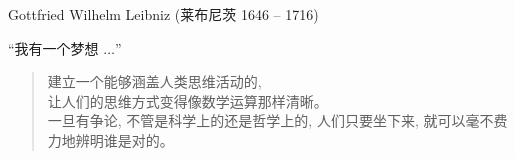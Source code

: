 \begin{frame}{}

  \pause
  \begin{center}
    Gottfried Wilhelm Leibniz (莱布尼茨 1646 -- 1716)
  \end{center}
\end{frame}

\begin{frame}{``我有一个梦想 $\ldots$''}
  \begin{quote}
    建立一个能够涵盖人类思维活动的,\\
    让人们的思维方式变得像数学运算那样清晰。\\[8pt]

    一旦有争论, 不管是科学上的还是哲学上的,
    人们只要坐下来,
    就可以毫不费力地辨明谁是对的。
  \end{quote}

  \vspace{0.80cm}
  \begin{quote}
    \centerline{}
  \end{quote}
\end{frame}
